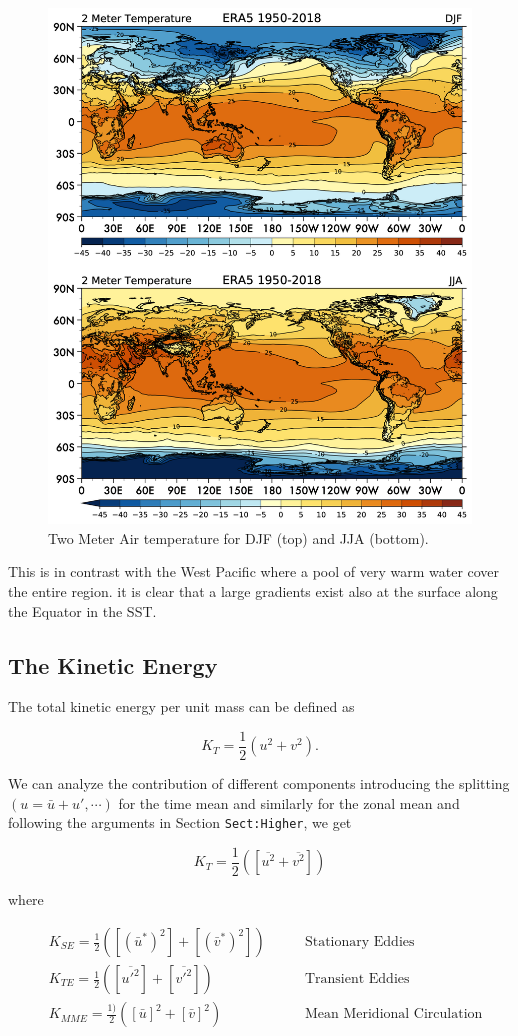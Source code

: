 \begin{figure}
	\centering
	\includegraphics[width = .7 \textwidth]{figs/GD/2T.png}
	\caption{Two Meter Air temperature for DJF (top) and JJA (bottom).}
	\label{fig:}
\end{figure}

This is in contrast with the West Pacific where a pool of very warm
water cover the entire region. it is clear that a large gradients exist
also at the surface along the Equator in the SST.

\subsection{The Kinetic Energy}\label{the-kinetic-energy}

The total kinetic energy per unit mass can be defined as

\[K_T = \frac{1} {2} ( u^2 + v^2).\]

We can analyze the contribution of different components introducing the
splitting \((u = \bar{u}+ u', \cdots )\) for the time mean and similarly
for the zonal mean and following the arguments in Section
\texttt{Sect:Higher}, we get

\[K_T = \frac{1} {2}( [\overline{u^2} + \overline{v^2}])\]

where

\[\begin{aligned}
		 & K_{SE} =\frac{1} {2}( [(\bar{u}^*)^2]  + [(\bar{v}^*)^2]) \qquad      & \text{Stationary Eddies}           \\
		 & K_{TE} = \frac{1} {2}( [\overline{u'^2}]  +[\overline{v'^2}] ) \qquad & \text{Transient Eddies}            \\
		 & K_{MME} = \frac{1)} {2}([\bar{u}]^2 + [\bar{v}]^2) \qquad             & \text{Mean Meridional Circulation}
	\end{aligned}\]


